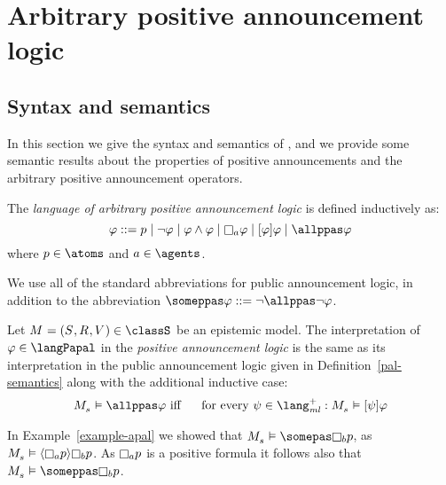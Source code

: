 \chapter{Arbitrary positive announcement logic}\label{papal}

\section{Syntax and semantics}\label{syntax-semantics}

In this section we give the syntax and semantics of \logicPapalS{}, and we provide some semantic results about the properties of positive announcements and the arbitrary positive announcement operators.

\begin{definition}\label{papal-syntax}
    The {\em language of arbitrary positive announcement logic \langPapal{}} is defined inductively as:
    $$
        \phi ::=
            \atomP \mid
            \neg \phi \mid
            \phi \land \phi \mid
            \necessary[\agentA] \phi \mid
            \announceA{\phi} \phi \mid
            \allppas \phi
    $$
    where $\atomP \in \atoms$ and $\agentA \in \agents$.
\end{definition}

We use all of the standard abbreviations for public announcement logic, in addition to the abbreviation $\someppas \phi ::= \neg \allppas \neg \phi$.

\begin{definition}\label{papal-semantics}
    Let $\kModelAndTuple \in \classS$ be an epistemic model.
    The interpretation of $\phi \in \langPapal$ in the {\em positive announcement logic \logicPapalS{}} is the same as its interpretation in the public announcement logic \logicPalS{} given in Definition~\ref{pal-semantics} along with the additional inductive case:
    \begin{eqnarray*}
        \kPModel{\kStateS} \entails \allppas \phi &\text{ iff }& \text{ for every } \psi \in \langMlPlus : \kPModel{\kStateS} \entails \announceA{\psi} \phi
    \end{eqnarray*}
\end{definition}

\begin{example}\label{example-papal}
    In Example~\ref{example-apal} we showed that $\kPModel{\kStateS} \entails \somepas \knows[\agentB] \atomP$, as $\kPModel{\kStateS} \entails \announceE{\knows[\agentA] \atomP} \knows[\agentB] \atomP$.
    As $\knows[\agentA] \atomP$ is a positive formula it follows also that $\kPModel{\kStateS} \entails \someppas \knows[\agentB] \atomP$.
\end{example}


